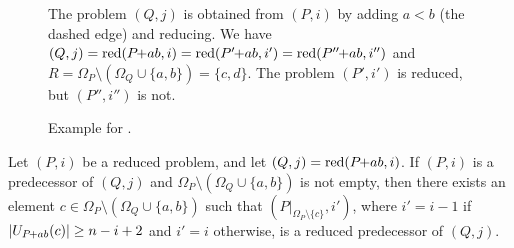 \documentclass[a4paper,UKenglish,cleveref, autoref, thm-restate, anonymous]{lipics-v2021}
\newcommand{\pchild}[3]{{#1}\kern-1pt{+}{#2}{#3}}
\newcommand{\reduced}[1]{\operatorname{red}#1}
\newcommand{\greater}[2]{U_{#1}(#2)}
\begin{document}
\begin{figure}[t]
{}

{\small
The problem $(Q, j)$ is obtained from $(P, i)$ by adding $a < b$ (the dashed edge) and reducing.
We have $(Q, j) = \reduced(\pchild{P}{a}{b}, i) = \reduced(\pchild{P'}{a}{b}, i') = \reduced(\pchild{P''}{a}{b}, i'')$ and $R = \Omega_P \setminus (\Omega_Q \cup \{a, b\}) = \{c, d\}$.
The problem $(P', i')$ is reduced, but $(P'', i'')$ is not.
}

  \caption{
    Example for .
  }
  \label{fig:lemma_viz_example}
\end{figure}

\begin{lemma} \label{lemma:remove_elements_iteratively}
  Let $(P, i)$ be a reduced problem, and let $(Q, j) = \reduced{(\pchild{P}{a}{b}, i)}$.
  If $(P, i)$ is a predecessor of $(Q, j)$ and $\Omega_P \setminus (\Omega_Q \cup \{a, b\})$ is not empty, then there exists an element $c \in \Omega_P \setminus (\Omega_Q \cup \{a, b\})$ such that $(P|_{\Omega_P \setminus \{c\}}, i')$, where $i' = i - 1$ if $|\greater{\pchild{P}{a}{b}}{c}| \ge n - i + 2$ and $i' = i$ otherwise, is a reduced predecessor of $(Q, j)$.
\end{lemma}
\end{document}
